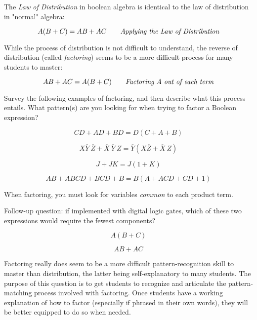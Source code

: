 

The {\it Law of Distribution} in boolean algebra is identical to the law of distribution in "normal" algebra:

$$A(B + C) = AB + AC \hbox{\hskip 20pt {\it Applying the Law of Distribution}}$$

While the process of distribution is not difficult to understand, the reverse of distribution (called {\it factoring}) seems to be a more difficult process for many students to master:

$$AB + AC = A(B + C) \hbox{\hskip 20pt {\it Factoring A out of each term}}$$

Survey the following examples of factoring, and then describe what this process entails.  What pattern(s) are you looking for when trying to factor a Boolean expression?

$$CD + AD + BD = D(C + A + B)$$

$$X \overline{Y} \> \overline{Z} + \overline{X} \> \overline{Y} \> Z = \overline{Y}(X \overline{Z} + \overline{X} \> Z)$$

$$J + JK = J(1 + K)$$

$$AB + ABCD + BCD + B = B(A + ACD + CD + 1)$$







When factoring, you must look for variables {\it common} to each product term.

\vskip 10pt

Follow-up question: if implemented with digital logic gates, which of these two expressions would require the fewest components?

$$A(B + C)$$

$$AB + AC$$







Factoring really does seem to be a more difficult pattern-recognition skill to master than distribution, the latter being self-explanatory to many students.  The purpose of this question is to get students to recognize and articulate the pattern-matching process involved with factoring.  Once students have a working explanation of how to factor (especially if phrased in their own words), they will be better equipped to do so when needed.




